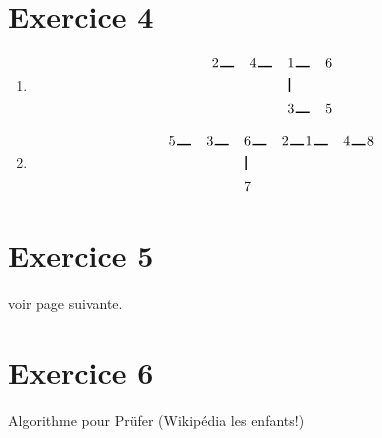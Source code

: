 \documentclass{article}
\begin{document}
\section*{Exercice 4}
\begin{enumerate}
\item 
\begin{alignat*}{10}
&2 \hspace{1pt}\rule{10pt}{1pt} \hspace{1pt}&&4\hspace{1pt}\rule{10pt}{1pt} \hspace{1pt}&&1\hspace{1pt}\rule{10pt}{1pt}\hspace{1pt} &6\\
& && &&\hspace{1pt}\rule{1pt}{10pt} &\\
& && &&3 \hspace{1pt}\rule{10pt}{1pt} &5
\end{alignat*}
\item
\begin{alignat*}{10}
&5 \hspace{1pt}\rule{10pt}{1pt} \hspace{1pt}&&3 \hspace{1pt}\rule{10pt}{1pt} \hspace{1pt}&&6 \hspace{1pt}\rule{10pt}{1pt}\hspace{1pt} &2\hspace{1pt}\rule{10pt}{1pt}\hspace{1pt} &1 \hspace{1pt}\rule{10pt}{1pt}\hspace{1pt} &4 \hspace{1pt}\rule{10pt}{1pt}\hspace{1pt} &8\\
& && &&\hspace{1pt}\rule{1pt}{10pt} &\\
& && &&7
\end{alignat*}
\end{enumerate}

\section*{Exercice 5}
voir page suivante.

\section*{Exercice 6}
Algorithme pour Prüfer (Wikipédia les enfants!)
\end{document}
